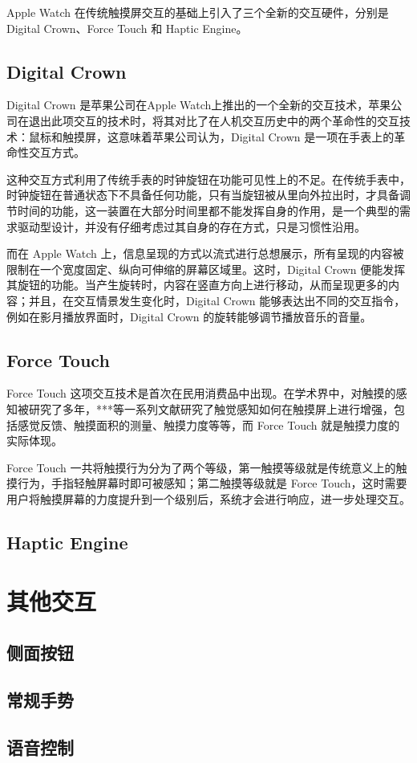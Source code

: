 Apple Watch 在传统触摸屏交互的基础上引入了三个全新的交互硬件，分别是Digital Crown、Force Touch 和 Haptic Engine。

\subsection{Digital Crown}

Digital Crown 是苹果公司在Apple Watch上推出的一个全新的交互技术，苹果公司在退出此项交互的技术时，将其对比了在人机交互历史中的两个革命性的交互技术：鼠标和触摸屏，这意味着苹果公司认为，Digital Crown 是一项在手表上的革命性交互方式。

这种交互方式利用了传统手表的时钟旋钮在功能可见性上的不足。在传统手表中，时钟旋钮在普通状态下不具备任何功能，只有当旋钮被从里向外拉出时，才具备调节时间的功能，这一装置在大部分时间里都不能发挥自身的作用，是一个典型的需求驱动型设计，并没有仔细考虑过其自身的存在方式，只是习惯性沿用。

而在 Apple Watch 上，信息呈现的方式以流式进行总想展示，所有呈现的内容被限制在一个宽度固定、纵向可伸缩的屏幕区域里。这时，Digital Crown 便能发挥其旋钮的功能。当产生旋转时，内容在竖直方向上进行移动，从而呈现更多的内容；并且，在交互情景发生变化时，Digital Crown 能够表达出不同的交互指令，例如在影月播放界面时，Digital Crown 的旋转能够调节播放音乐的音量。

\subsection{Force Touch}

Force Touch 这项交互技术是首次在民用消费品中出现。在学术界中，对触摸的感知被研究了多年，***等一系列文献研究了触觉感知如何在触摸屏上进行增强，包括感觉反馈、触摸面积的测量、触摸力度等等，而 Force Touch 就是触摸力度的实际体现。

Force Touch 一共将触摸行为分为了两个等级，第一触摸等级就是传统意义上的触摸行为，手指轻触屏幕时即可被感知；第二触摸等级就是 Force Touch，这时需要用户将触摸屏幕的力度提升到一个级别后，系统才会进行响应，进一步处理交互。

\subsection{Haptic Engine}

\section{其他交互}

\subsection{侧面按钮}

\subsection{常规手势}

\subsection{语音控制}
